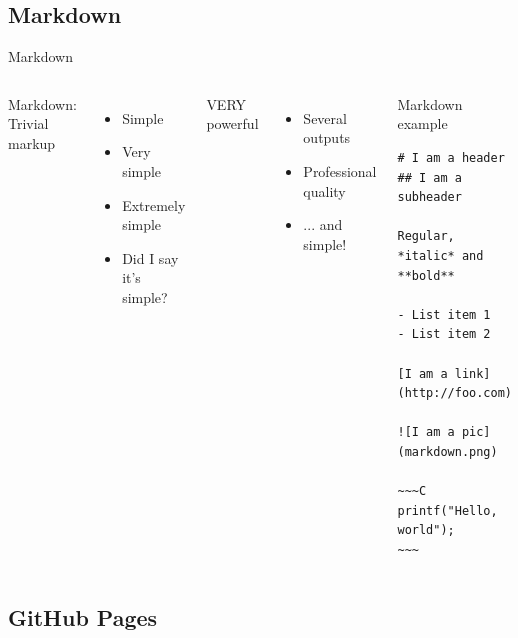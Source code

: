 \documentclass[10pt,compress]{beamer} %
\begin{document}
\subsection{Markdown}
\begin{frame}[fragile]{Markdown}
	\vspace{-0.3cm}
	\begin{columns}
	Markdown: Trivial markup
	\begin{itemize}
		\item Simple
		\item Very simple
		\item Extremely simple
		\item Did I say it's simple?
	\end{itemize}
	VERY powerful
	\begin{itemize}
		\item Several outputs
		\item Professional quality
		\item ... and simple!
	\end{itemize}
		\begin{exampleblock}{Markdown example}
			\vspace{-0.3cm}
			\begin{lstlisting}[mathescape]
# I am a header
## I am a subheader

Regular, *italic* and **bold**

- List item 1
- List item 2

[I am a link](http://foo.com)

![I am a pic](markdown.png)

~~~C
printf("Hello, world");
~~~
			\end{lstlisting}
			\vspace{-0.2cm}
		\end{exampleblock}
	\end{columns}
\end{frame}

\subsection{GitHub Pages}
\end{document}
